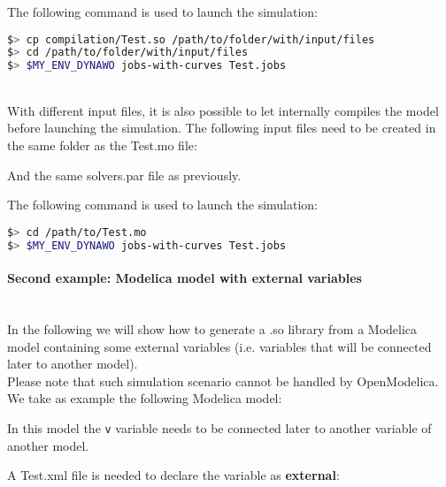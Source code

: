 \documentclass[a4paper, 12pt]{report}
\begin{document}
The following command is used to launch the simulation:
\begin{lstlisting}[language=bash,deletekeywords={jobs,help}]
$> cp compilation/Test.so /path/to/folder/with/input/files
$> cd /path/to/folder/with/input/files
$> $MY_ENV_DYNAWO jobs-with-curves Test.jobs
\end{lstlisting}

~~\\
With different input files, it is also possible to let \Dynawo
internally compiles the model before launching the simulation. The following input files need to be created in the same folder as the Test.mo file:




And the same solvers.par file as previously.

The following command is used to launch the simulation:
\begin{lstlisting}[language=bash,deletekeywords={jobs,help}]
$> cd /path/to/Test.mo
$> $MY_ENV_DYNAWO jobs-with-curves Test.jobs
\end{lstlisting}

\paragraph{Second example: Modelica model with external variables}
\label{Dynawo_Advanced_Documentation_Dynawo_executables_execDynawo_second_example}
~~\\
In the following we will show how to generate a .so library from a
Modelica model containing some external variables (i.e. variables that will be connected later to another model). \\

Please note that such simulation scenario cannot be handled by OpenModelica. \\

We take as example the following Modelica model:

In this model the \lstinline[language=Modelica]{v} variable needs to be connected later to another variable of another model. 

A Test.xml file is needed to declare the variable as \textbf{external}:
\end{document}
